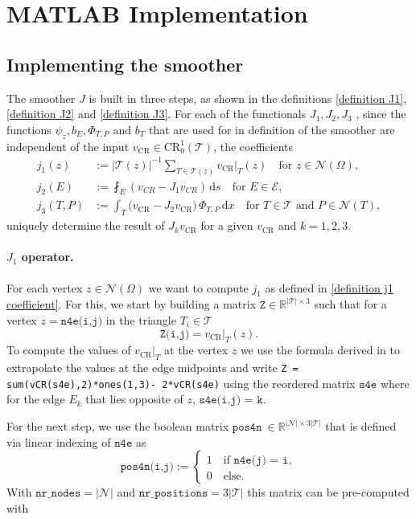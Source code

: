 \documentclass[11pt,a4paper]{article}
\newcommand{\vCR}{v_{\mathrm{CR}}}
\newcommand{\dx}{\,\mathrm{d}x}
\newcommand{\ds}{\,\mathrm{d}s}
\newcommand{\CR}{\mathrm{CR}^1_0(\mathcal{T})}
\begin{document}
\section{MATLAB Implementation}
\label{sec:implementation}
\subsection{Implementing the smoother} \label{implementing the smoother}
The smoother \(J\) is built in three steps, as shown in the definitions \eqref{definition J1}, \eqref{definition J2} and \eqref{definition J3}. For each of the functionals \(J_1, J_2, J_3\) , since the functions \(\psi_z, b_E, \Phi_{T,P} \text{ and } b_T\) that are used for in definition of the smoother are independent of the input \(\vCR \in \CR\), the coefficients
\begin{align}
    j_1(z) &:= |\mathcal{T}(z)|^{-1} \sum_{T \in \mathcal{T}(z)} {\vCR|_T(z)} \quad \text{for } z \in \mathcal{N}(\Omega) \label{definition j1 coefficient},\\
    j_2(E) &:= \fint_{E} \left( v_{CR} - J_{1} v_{CR} \right) \ds \quad \text{for } E \in \mathcal{E} \label{definition j2 coefficient}, \\
    j_3(T,P) &:= \int_T \bigl( \vCR - J_2 \vCR \bigr)\, \Phi_{T,P} \dx \label{definition j3 coefficients} \quad \text{for } T \in \mathcal{T} \text{ and } P \in \mathcal{N}(T),
\end{align}
uniquely determine the result of \(J_k \vCR\) for a given \(\vCR\) and \(k=1,2,3\).
\paragraph{\(J_1\) operator.}
For each vertex \(z \in \mathcal{N}(\Omega)\) we want to compute
\(j_1\) as defined in \eqref{definition j1 coefficient}. For this, we start by building a matrix \(\texttt{Z} \in \mathbb{R}^{|\mathcal{T}| \times 3}\) such that for a vertex \(z = \texttt{n4e(i,j)}\) in the triangle \(T_i \in \mathcal{T}\)
\[
\texttt{Z(i,j)} = \vCR|_T(z).
\]
To compute the values of \(\vCR|_T\) at the vertex \(z\) we use the formula derived in \cite[p.157]{GNUMOscript} to extrapolate the values at the edge midpoints and write \texttt{Z = sum(vCR(s4e),2)*ones(1,3)- 2*vCR(s4e)} using the reordered matrix \(\texttt{s4e}\) where for the edge \(E_k\) that lies opposite of \(z\), \(\texttt{s4e(i,j) = k}\).

For the next step, we use the boolean matrix \(\texttt{pos4n}\ \in \mathbb{R}^{|\mathcal{N}| \times 3|\mathcal{T}|}\) that is defined via linear indexing of \(\texttt{n4e}\) as 
\[
\texttt{pos4n(i,j)} := \begin{cases}
    1 \quad \text{if } \texttt{n4e(j) = i}, \\
    0 \quad \text{else}.
\end{cases}
\]
With \(\texttt{nr\_nodes} = |\mathcal{N}|\) and \(\texttt{nr\_positions} = 3|\mathcal{T}|\) this matrix can be pre-computed with
\end{document}
